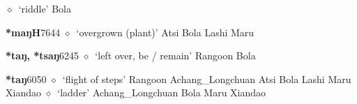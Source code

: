 \begin{list}{}{\leftmargin=1.5em \itemindent=-1.5em}
\hspace{1ex}
         $\diamond$~`riddle'
         Bola 
  \item {\footnotesize \textbf{*maŋH}}{\tiny 7644}
\hspace{1ex}
         $\diamond$~`overgrown (plant)'
         Atsi 
\hspace{1ex}
         Bola 
\hspace{1ex}
         Lashi 
\hspace{1ex}
         Maru 
  \item {\footnotesize \textbf{*taŋ, *tsaŋ}}{\tiny 6245}
\hspace{1ex}
         $\diamond$~`left over, be / remain'
         Rangoon 
\hspace{1ex}
         Bola 
  \item {\footnotesize \textbf{*taŋ}}{\tiny 6050}
\hspace{1ex}
         $\diamond$~`flight of steps'
         Rangoon 
\hspace{1ex}
         Achang\_Longchuan 
\hspace{1ex}
         Atsi 
\hspace{1ex}
         Bola 
\hspace{1ex}
         Lashi 
\hspace{1ex}
         Maru 
\hspace{1ex}
         Xiandao 
\hspace{1ex}
         $\diamond$~`ladder'
         Achang\_Longchuan 
\hspace{1ex}
         Bola 
\hspace{1ex}
         Maru 
\hspace{1ex}
         Xiandao 
  \end{list}
\item

